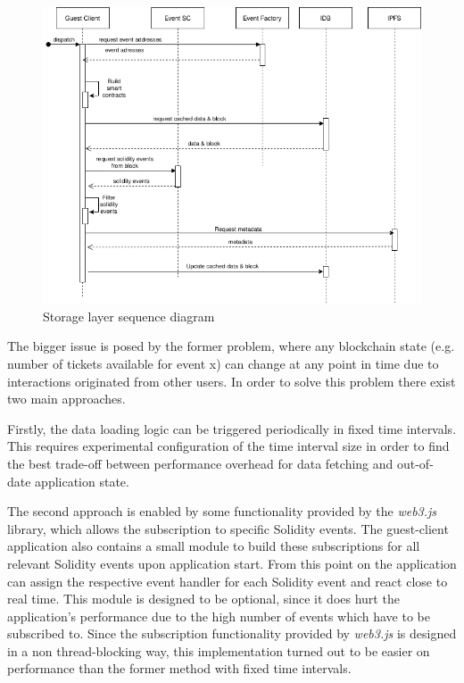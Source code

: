 \begin{figure}[H]
    \centering
    \includegraphics[width=14cm]{images/storage_sequence.png}
    \caption{Storage layer sequence diagram}
    \label{fig:storage_sequence}
\end{figure}

The bigger issue is posed by the former problem, where any blockchain state (e.g. number of tickets available for event x) can change at any point in time due to interactions originated from other users. In order to solve this problem there exist two main approaches. 

Firstly, the data loading logic can be triggered periodically in fixed time intervals. This requires experimental configuration of the time interval size in order to find the best trade-off between performance overhead for data fetching and out-of-date application state. 

The second approach is enabled by some functionality provided by the \textit{web3.js} library, which allows the subscription to specific Solidity events. The guest-client application also contains a small module to build these subscriptions for all relevant Solidity events upon application start. From this point on the application can assign the respective event handler for each Solidity event and react close to real time. This module is designed to be optional, since it does hurt the application's performance due to the high number of events which have to be subscribed to. Since the subscription functionality provided by \textit{web3.js} is designed in a non thread-blocking way, this implementation turned out to be easier on performance than the former method with fixed time intervals.

